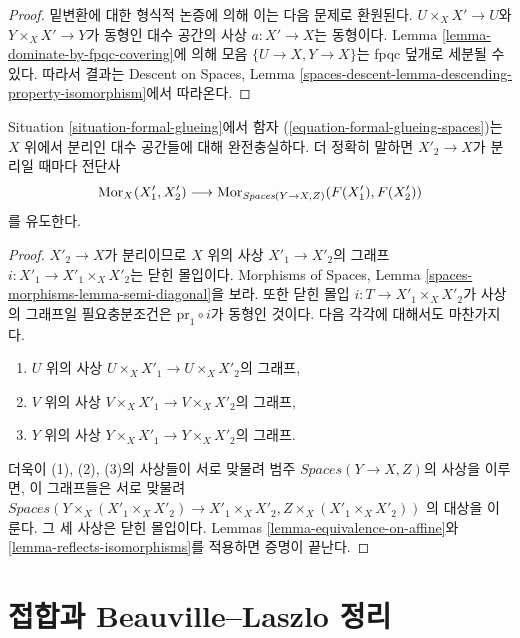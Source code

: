 \begin{proof}
밑변환에 대한 형식적 논증에 의해 이는 다음 문제로 환원된다.
$U \times_X X' \to U$와 $Y \times_X X' \to Y$가 동형인 대수 공간의
사상 $a : X' \to X$는 동형이다. Lemma
\ref{lemma-dominate-by-fpqc-covering}에 의해 모음
$\{U \to X, Y \to X\}$는 fpqc 덮개로 세분될 수 있다. 따라서 결과는
Descent on Spaces, Lemma
\ref{spaces-descent-lemma-descending-property-isomorphism}에서 따라온다.
\end{proof}

\begin{lemma}
\label{lemma-fully-faithful-on-separated}
Situation \ref{situation-formal-glueing}에서 함자
(\ref{equation-formal-glueing-spaces})는 $X$ 위에서 분리인 대수 공간들에
대해 완전충실하다. 더 정확히 말하면 $X'_2 \to X$가 분리일 때마다 전단사
$$
\mathop{\mathrm{Mor}}\nolimits_X(X'_1, X'_2)
\longrightarrow
\mathop{\mathrm{Mor}}\nolimits_{\textit{Spaces}(Y \to X, Z)}(F(X'_1), F(X'_2))
$$
를 유도한다.
\end{lemma}

\begin{proof}
$X'_2 \to X$가 분리이므로 $X$ 위의 사상 $X'_1 \to X'_2$의 그래프
$i : X'_1 \to X'_1 \times_X X'_2$는 닫힌 몰입이다. Morphisms of Spaces,
Lemma \ref{spaces-morphisms-lemma-semi-diagonal}을 보라. 또한 닫힌 몰입
$i : T \to X'_1 \times_X X'_2$가 사상의 그래프일 필요충분조건은
$\text{pr}_1 \circ i$가 동형인 것이다. 다음 각각에 대해서도 마찬가지다.
\begin{enumerate}
\item $U$ 위의 사상 $U \times_X X'_1 \to U \times_X X'_2$의 그래프,
\item $V$ 위의 사상 $V \times_X X'_1 \to V \times_X X'_2$의 그래프,
\item $Y$ 위의 사상 $Y \times_X X'_1 \to Y \times_X X'_2$의 그래프.
\end{enumerate}
더욱이 (1), (2), (3)의 사상들이 서로 맞물려 범주
$\textit{Spaces}(Y \to X, Z)$의 사상을 이루면, 이 그래프들은 서로 맞물려
$
\textit{Spaces}(Y \times_X (X'_1 \times_X X'_2) \to X'_1 \times_X X'_2,
Z \times_X (X'_1 \times_X X'_2))
$
의 대상을 이룬다.
그 세 사상은 닫힌 몰입이다. Lemmas
\ref{lemma-equivalence-on-affine}와
\ref{lemma-reflects-isomorphisms}를 적용하면 증명이 끝난다.
\end{proof}

\section{접합과 Beauville--Laszlo 정리}
\label{section-glueing-beauville-laszlo}

